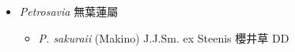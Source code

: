 
  \begin{itemize}
 \item[] \textit{Petrosavia} 無葉蓮屬
                                
  \begin{itemize}
        \item[] \textit{P. sakuraii} (Makino) J.J.Sm. ex Steenis  櫻井草   DD
  \end{itemize}
  \end{itemize}
